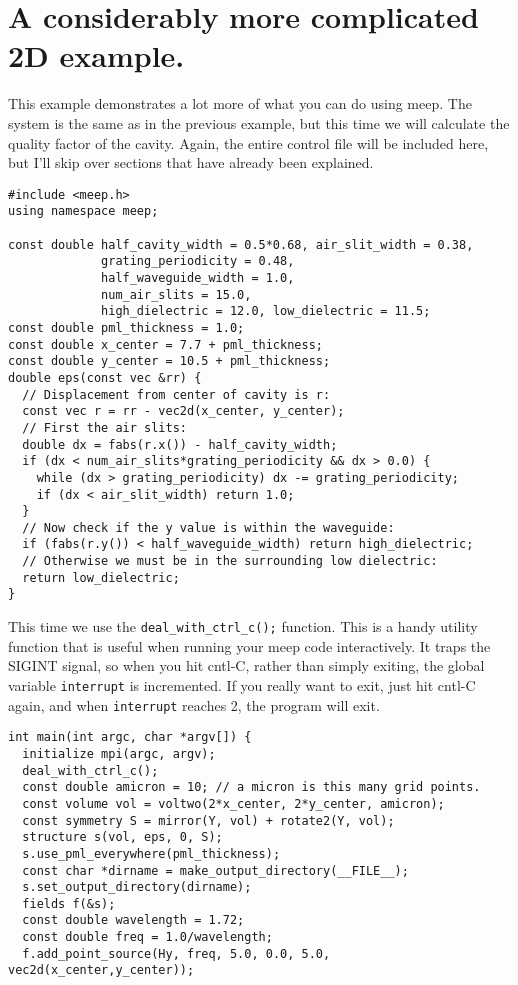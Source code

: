 \begin{comment}
/*
\end{comment}
\section{A considerably more complicated 2D example.}
\begin{comment}
*/
\end{comment}

This example demonstrates a lot more of what you can do using meep.  The
system is the same as in the previous example, but this time we will
calculate the quality factor of the cavity.  Again, the entire control file
will be included here, but I'll skip over sections that have already been
explained.

\begin{verbatim}
#include <meep.h>
using namespace meep;

const double half_cavity_width = 0.5*0.68, air_slit_width = 0.38,
             grating_periodicity = 0.48,
             half_waveguide_width = 1.0,
             num_air_slits = 15.0,
             high_dielectric = 12.0, low_dielectric = 11.5;
const double pml_thickness = 1.0;
const double x_center = 7.7 + pml_thickness;
const double y_center = 10.5 + pml_thickness;
double eps(const vec &rr) {
  // Displacement from center of cavity is r:
  const vec r = rr - vec2d(x_center, y_center);
  // First the air slits:
  double dx = fabs(r.x()) - half_cavity_width;
  if (dx < num_air_slits*grating_periodicity && dx > 0.0) {
    while (dx > grating_periodicity) dx -= grating_periodicity;
    if (dx < air_slit_width) return 1.0;
  }
  // Now check if the y value is within the waveguide:
  if (fabs(r.y()) < half_waveguide_width) return high_dielectric;
  // Otherwise we must be in the surrounding low dielectric:
  return low_dielectric;
}
\end{verbatim}
This time we use the \verb!deal_with_ctrl_c();! function.  This is a handy
utility function that is useful when running your meep code
interactively.  It traps the SIGINT signal, so when you hit cntl-C, rather
than simply exiting, the global variable \verb!interrupt! is incremented.
If you really want to exit, just hit cntl-C again, and when
\verb!interrupt! reaches 2, the program will exit.
\begin{verbatim}
int main(int argc, char *argv[]) {
  initialize mpi(argc, argv);
  deal_with_ctrl_c();
  const double amicron = 10; // a micron is this many grid points.
  const volume vol = voltwo(2*x_center, 2*y_center, amicron);
  const symmetry S = mirror(Y, vol) + rotate2(Y, vol);
  structure s(vol, eps, 0, S);
  s.use_pml_everywhere(pml_thickness);
  const char *dirname = make_output_directory(__FILE__);
  s.set_output_directory(dirname);
  fields f(&s);
  const double wavelength = 1.72;
  const double freq = 1.0/wavelength;
  f.add_point_source(Hy, freq, 5.0, 0.0, 5.0, vec2d(x_center,y_center));
\end{verbatim}
